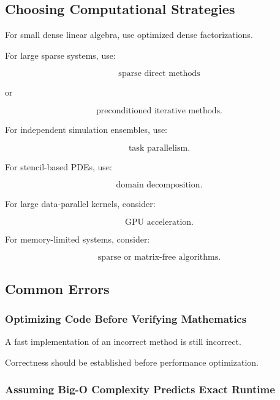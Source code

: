 \subsection{Choosing Computational Strategies}
\label{subsec:choosing-computational-strategies}

For small dense linear algebra, use optimized dense factorizations.

For large sparse systems, use:

\[
\boxed{
\text{sparse direct methods}
}
\]

or

\[
\boxed{
\text{preconditioned iterative methods}.
}
\]

For independent simulation ensembles, use:

\[
\boxed{
\text{task parallelism}.
}
\]

For stencil-based PDEs, use:

\[
\boxed{
\text{domain decomposition}.
}
\]

For large data-parallel kernels, consider:

\[
\boxed{
\text{GPU acceleration}.
}
\]

For memory-limited systems, consider:

\[
\boxed{
\text{sparse or matrix-free algorithms}.
}
\]

\subsection{Common Errors}
\label{subsec:scientific-computing-common-errors}

\subsubsection{Optimizing Code Before Verifying Mathematics}

A fast implementation of an incorrect method is still incorrect.

Correctness should be established before performance optimization.

\subsubsection{Assuming Big-O Complexity Predicts Exact Runtime}

